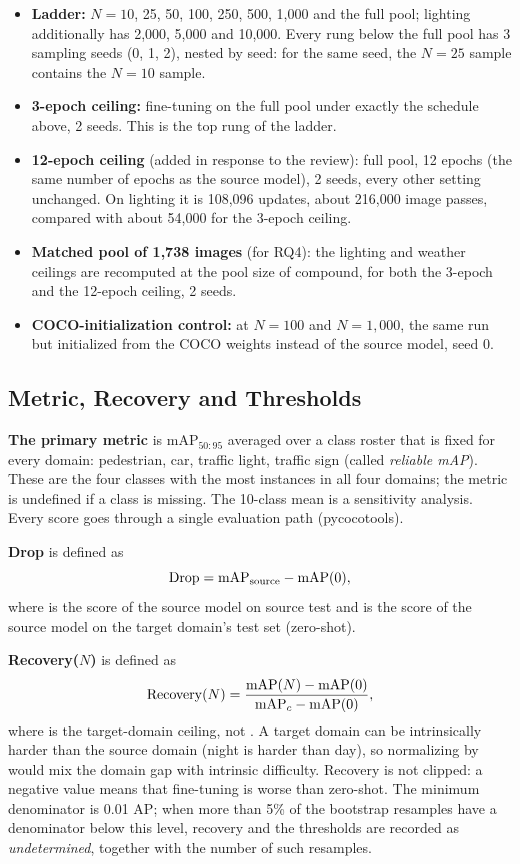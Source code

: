 \begin{itemize}
\item \textbf{Ladder:} $N = 10$, 25, 50, 100, 250, 500, 1,000 and the full pool; lighting additionally has 2,000, 5,000 and 10,000. Every rung below the full pool has 3 sampling seeds (0, 1, 2), nested by seed: for the same seed, the $N = 25$ sample contains the $N = 10$ sample.
\item \textbf{3-epoch ceiling:} fine-tuning on the full pool under exactly the schedule above, 2 seeds. This is the top rung of the ladder.
\item \textbf{12-epoch ceiling} (added in response to the review): full pool, 12 epochs (the same number of epochs as the source model), 2 seeds, every other setting unchanged. On lighting it is 108,096 updates, about 216,000 image passes, compared with about 54,000 for the 3-epoch ceiling.
\item \textbf{Matched pool of 1,738 images} (for RQ4): the lighting and weather ceilings are recomputed at the pool size of compound, for both the 3-epoch and the 12-epoch ceiling, 2 seeds.
\item \textbf{COCO-initialization control:} at $N = 100$ and $N = 1{,}000$, the same run but initialized from the COCO weights instead of the source model, seed 0.
\end{itemize}

\subsection{Metric, Recovery and Thresholds}\label{sec:metrics}

\textbf{The primary metric} is mAP$_{50:95}$ averaged over a class roster that is fixed for every domain: pedestrian, car, traffic light, traffic sign (called \emph{reliable mAP}). These are the four classes with the most instances in all four domains; the metric is undefined if a class is missing. The 10-class mean is a sensitivity analysis. Every score goes through a single evaluation path (pycocotools).

\textbf{Drop} is defined as
\begin{equation}
\mathrm{Drop} = \mathrm{mAP}_{\mathrm{source}} - \mathrm{mAP}(0),
\label{eq:drop}
\end{equation}
where \mAPsrc is the score of the source model on source test and \mAPzero is the score of the source model on the target domain's test set (zero-shot).

\textbf{Recovery(\boldmath$N$)} is defined as
\begin{equation}
\mathrm{Recovery}(N) = \frac{\mathrm{mAP}(N) - \mathrm{mAP}(0)}{\mathrm{mAP}_{c} - \mathrm{mAP}(0)},
\label{eq:recovery}
\end{equation}
where \mAPc is the target-domain ceiling, not \mAPsrc. A target domain can be intrinsically harder than the source domain (night is harder than day), so normalizing by \mAPsrc would mix the domain gap with intrinsic difficulty. Recovery is not clipped: a negative value means that fine-tuning is worse than zero-shot. The minimum denominator is 0.01 AP; when more than 5\% of the bootstrap resamples have a denominator below this level, recovery and the thresholds are recorded as \emph{undetermined}, together with the number of such resamples.

